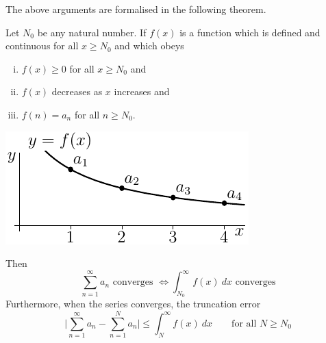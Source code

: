 The above arguments are formalised in the following theorem.
\begin{theorem}\label{thm:SRintegralTest}
Let $N_0$ be any natural number. If $f(x)$ is a function which is defined
and continuous for all $x\ge N_0$ and which obeys
\begin{enumerate}[(i)]\itemsep1pt \parskip0pt  %
\item $f(x)\ge 0$ for all $x\ge N_0$ and
\item $f(x)$ decreases as $x$ increases and
\item $f(n)=a_n$ for all  $n\ge N_0$.
\end{enumerate}
\begin{center}
   \includegraphics{intTest}
\end{center}
Then
\begin{equation*}
\sum_{n=1}^\infty a_n\text{ converges }\iff
\int_{N_0}^\infty f(x)\ dx\text{ converges}
\end{equation*}
Furthermore, when the series converges, the truncation error
\begin{equation*}
\bigg|\sum_{n=1}^\infty a_n-\sum_{n=1}^N a_n\bigg|\le
  \int_N^\infty f(x)\ dx\qquad\text{for all $N\ge N_0$}
\end{equation*}
\end{theorem}

